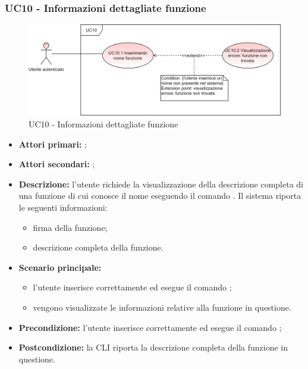 \subsubsection{UC10 - Informazioni dettagliate funzione}
\begin{figure}[h]
	\centering
	\includegraphics[scale=\ucs]{./res/img/UC10.png}
	\caption {UC10 - Informazioni dettagliate funzione}
\end{figure}
\begin{itemize}
	\item \textbf{Attori primari:} \ua{};
	\item \textbf{Attori secondari:} \re{};
	\item \textbf{Descrizione:} l’utente richiede la visualizzazione della descrizione completa di una funzione di cui conosce il nome eseguendo il comando \pinfo{}. Il sistema riporta le seguenti informazioni:  
	\begin{itemize}
		\item firma della funzione;
		\item descrizione completa della funzione.
	\end{itemize} 
	\item \textbf{Scenario principale:} 
	\begin{itemize}
		\item l'utente inserisce correttamente ed esegue il comando \pinfo{}; 
		\item vengono visualizzate le informazioni relative alla funzione in questione.
	\end{itemize}
	\item \textbf{Precondizione:} l'utente inserisce correttamente ed esegue il comando \pinfo{};
	\item \textbf{Postcondizione:} la CLI riporta la descrizione completa della funzione in questione.
\end{itemize}